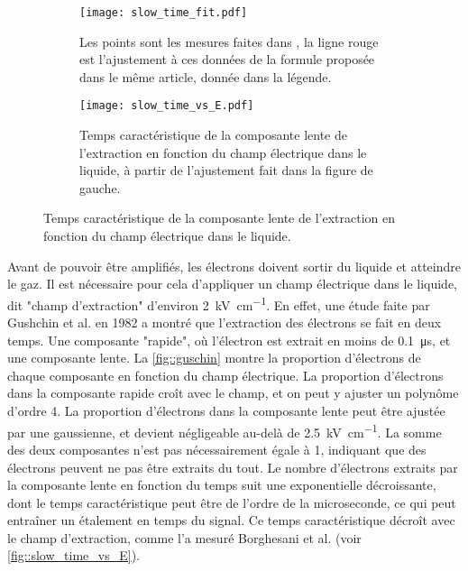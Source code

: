       \begin{figure}[htbp]
        \begin{subfigure}[t]{0.5\textwidth}
          \flushleft
          \captionsetup{width=.95\linewidth}
          \texttt{[image: slow\_time\_fit.pdf]}
          \caption{Les points sont les mesures faites dans \cite{Borghesani1990}, la ligne rouge est l'ajustement à ces données de la formule proposée dans le même article, donnée dans la légende.}
        \end{subfigure}
        \begin{subfigure}[t]{0.5\textwidth}
          \flushright        
          \captionsetup{width=.95\linewidth}
          \texttt{[image: slow\_time\_vs\_E.pdf]}
          \caption{Temps caractéristique de la composante lente de l'extraction en fonction du champ électrique dans le liquide, à partir de l'ajustement fait dans la figure de gauche.}
        \end{subfigure}
        \caption[Temps caractéristique l'extraction en fonction du champ électrique]{\label{fig::slow_time_vs_E}Temps caractéristique de la composante lente de l'extraction en fonction du champ électrique dans le liquide.}
      \end{figure}

      Avant de pouvoir être amplifiés, les électrons doivent sortir du liquide et atteindre le gaz. Il est nécessaire pour cela d'appliquer un champ électrique dans le liquide, dit "champ d'extraction" d'environ \SI{2}{\kilo\volt\per\centi\meter}. En effet, une étude faite par Gushchin et al. en 1982\cite{guschin} a montré que l'extraction des électrons se fait en deux temps. Une composante "rapide", où l'électron est extrait en moins de \SI{0.1}{\micro\second}, et une composante lente.  La \autoref{fig::guschin} montre la proportion d'électrons de chaque composante en fonction du champ électrique. La proportion d'électrons dans la composante rapide croît avec le champ, et on peut y ajuster un polynôme d'ordre 4. La proportion d'électrons dans la composante lente peut être ajustée par une gaussienne, et devient négligeable au-delà de \SI{2.5}{\kilo\volt\per\centi\meter}. La somme des deux composantes n'est pas nécessairement égale à 1, indiquant que des électrons peuvent ne pas être extraits du tout. Le nombre d'électrons extraits par la composante lente en fonction du temps suit une exponentielle décroissante, dont le temps caractéristique peut être de l'ordre de la microseconde\cite{Borghesani1990}, ce qui peut entraîner un étalement en temps du signal. Ce temps caractéristique décroît avec le champ d'extraction, comme l'a mesuré Borghesani et al.\cite{Borghesani1990} (voir \autoref{fig::slow_time_vs_E}). %

